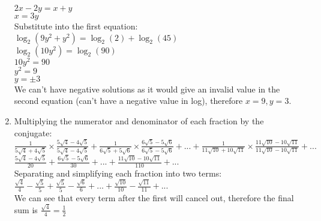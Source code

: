 \documentclass[../main.tex]{subfiles}
\begin{document}
\begin{enumerate}
    \(2x-2y=x+y\)\\

    \(x=3y\)\\
    
    Substitute into the first equation:\\
    \(\log_2(9y^2+y^2)=\log_2(2)+\log_2(45)\)\\

    \(\log_2(10y^2)=\log_2(90)\)\\

    \(10y^2=90\)\\

    \(y^2=9\)\\

    \(y=\pm 3\)\\

    We can't have negative solutions as it would give an invalid value in the second equation (can't have a negative value in log), therefore \(x=9, y=3\).\\

    \item 
    Multiplying the numerator and denominator of each fraction by the conjugate:\\
    \(\frac{1}{5\sqrt{4}+4\sqrt{5}}\times \frac{5\sqrt{4}-4\sqrt{5}}{5\sqrt{4}-4\sqrt{5}}+\frac{1}{6\sqrt{5}+5\sqrt{6}}\times \frac{6\sqrt{5}-5\sqrt{6}}{6\sqrt{5}-5\sqrt{6}}+...+\frac{1}{11\sqrt{10}+10\sqrt{11}}\times \frac{11\sqrt{10}-10\sqrt{11}}{11\sqrt{10}-10\sqrt{11}}+... \)\\

    \(\frac{5\sqrt{4}-4\sqrt{5}}{20}+\frac{6\sqrt{5}-5\sqrt{6}}{30}+...+\frac{11\sqrt{10}-10\sqrt{11}}{110}+...\)\\

    Separating and simplifying each fraction into two terms:\\
    \(\frac{\sqrt{4}}{4}-\frac{\sqrt{5}}{5}+\frac{\sqrt{5}}{5}-\frac{\sqrt{6}}{6}+...+\frac{\sqrt{10}}{10}-\frac{\sqrt{11}}{11}+...\)\\

    We can see that every term after the first will cancel out, therefore the final sum is \(\frac{\sqrt{4}}{4}=\frac{1}{2}\)
\end{enumerate}
\end{document}
